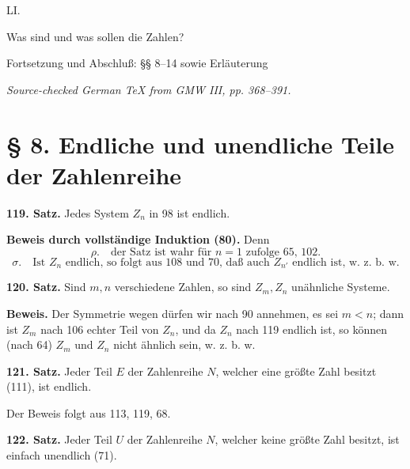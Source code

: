 \documentclass[11pt]{article}
\begin{document}
\begin{center}
{\Large LI.}\par\vspace{0.4em}
{\LARGE Was sind und was sollen die Zahlen?}\par
{\large Fortsetzung und Abschluß: §§ 8--14 sowie Erläuterung}\par\vspace{0.6em}
{\itshape Source-checked German TeX from GMW III, pp. 368--391.}
\end{center}
\section*{\S{} 8. Endliche und unendliche Teile der Zahlenreihe}

\noindent\textbf{119. Satz.} Jedes System $Z_n$ in 98 ist endlich.

\noindent\textbf{Beweis durch vollständige Induktion (80).} Denn
\[
\rho.\quad \text{der Satz ist wahr für }n=1\text{ zufolge 65, 102.}
\]
\[
\sigma.\quad \text{Ist }Z_n\text{ endlich, so folgt aus 108 und 70, daß auch }Z_{n'}\text{ endlich ist, w. z. b. w.}
\]

\noindent\textbf{120. Satz.} Sind $m,n$ verschiedene Zahlen, so sind $Z_m,Z_n$ unähnliche Systeme.

\noindent\textbf{Beweis.} Der Symmetrie wegen dürfen wir nach 90 annehmen, es sei $m<n$; dann ist $Z_m$ nach 106 echter Teil von $Z_n$, und da $Z_n$ nach 119 endlich ist, so können (nach 64) $Z_m$ und $Z_n$ nicht ähnlich sein, w. z. b. w.

\noindent\textbf{121. Satz.} Jeder Teil $E$ der Zahlenreihe $N$, welcher eine größte Zahl besitzt (111), ist endlich.

Der Beweis folgt aus 113, 119, 68.

\noindent\textbf{122. Satz.} Jeder Teil $U$ der Zahlenreihe $N$, welcher keine größte Zahl besitzt, ist einfach unendlich (71).
\end{document}

